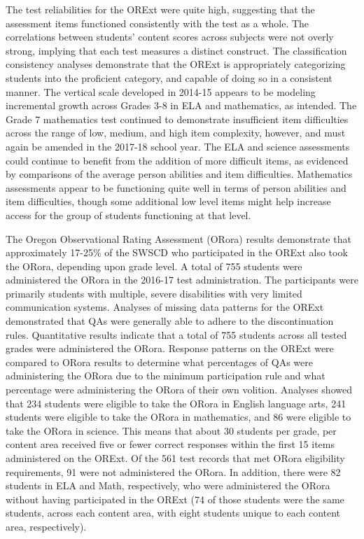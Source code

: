 \documentclass[]{article}
\begin{document}
The test reliabilities for the ORExt were quite high, suggesting that
the assessment items functioned consistently with the test as a whole.
The correlations between students' content scores across subjects were
not overly strong, implying that each test measures a distinct
construct. The classification consistency analyses demonstrate that the
ORExt is appropriately categorizing students into the proficient
category, and capable of doing so in a consistent manner. The vertical
scale developed in 2014-15 appears to be modeling incremental growth
across Grades 3-8 in ELA and mathematics, as intended. The Grade 7
mathematics test continued to demonstrate insufficient item difficulties
across the range of low, medium, and high item complexity, however, and
must again be amended in the 2017-18 school year. The ELA and science
assessments could continue to benefit from the addition of more
difficult items, as evidenced by comparisons of the average person
abilities and item difficulties. Mathematics assessments appear to be
functioning quite well in terms of person abilities and item
difficulties, though some additional low level items might help increase
access for the group of students functioning at that level.

The Oregon Observational Rating Assessment (ORora) results demonstrate
that approximately 17-25\% of the SWSCD who participated in the ORExt
also took the ORora, depending upon grade level. A total of 755 students
were administered the ORora in the 2016-17 test administration. The
participants were primarily students with multiple, severe disabilities
with very limited communication systems. Analyses of missing data
patterns for the ORExt demonstrated that QAs were generally able to
adhere to the discontinuation rules. Quantitative results indicate that
a total of 755 students across all tested grades were administered the
ORora. Response patterns on the ORExt were compared to ORora results to
determine what percentages of QAs were administering the ORora due to
the minimum participation rule and what percentage were administering
the ORora of their own volition. Analyses showed that 234 students were
eligible to take the ORora in English language arts, 241 students were
eligible to take the ORora in mathematics, and 86 were eligible to take
the ORora in science. This means that about 30 students per grade, per
content area received five or fewer correct responses within the first
15 items administered on the ORExt. Of the 561 test records that met
ORora eligibility requirements, 91 were not administered the ORora. In
addition, there were 82 students in ELA and Math, respectively, who were
administered the ORora without having participated in the ORExt (74 of
those students were the same students, across each content area, with
eight students unique to each content area, respectively).
\end{document}
